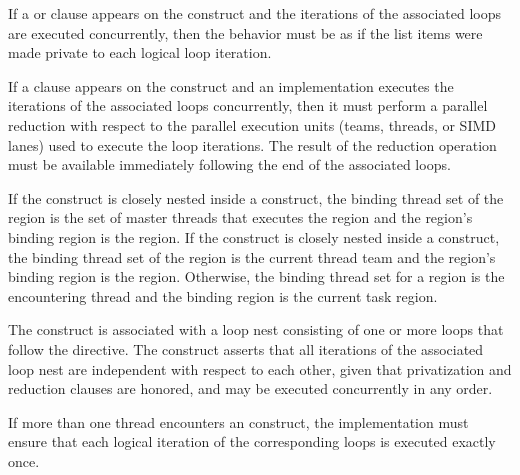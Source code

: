 
If a  or  clause appears on the
 construct and the iterations of the associated loops are
executed concurrently, then the behavior must be as if the list items were made
private to each logical loop iteration.

If a  clause appears on the  construct and an
implementation executes the iterations of the associated loops concurrently,
then it must perform a parallel reduction with respect to the parallel
execution units (teams, threads, or SIMD lanes) used to execute the loop
iterations. The result of the reduction operation must be available immediately
following the end of the associated loops.

\binding
If the  construct is closely nested inside a  construct,
the binding thread set of the region is the set of master threads that executes
the  region and the region's binding region is the  region. If the
 construct is closely nested inside a  construct, the
binding thread set of the region is the current thread team and the region's
binding region is the  region. Otherwise, the binding thread set for a
 region is the encountering thread and the binding region is the
current task region.

\descr
The  construct is associated with a loop nest consisting of
one or more loops that follow the directive. The construct asserts that all
iterations of the associated loop nest are independent with respect to each
other, given that privatization and reduction clauses are honored, and may be
executed concurrently in any order. 

If more than one thread encounters an  construct, the
implementation must ensure that each logical iteration of the corresponding
loops is executed exactly once.


